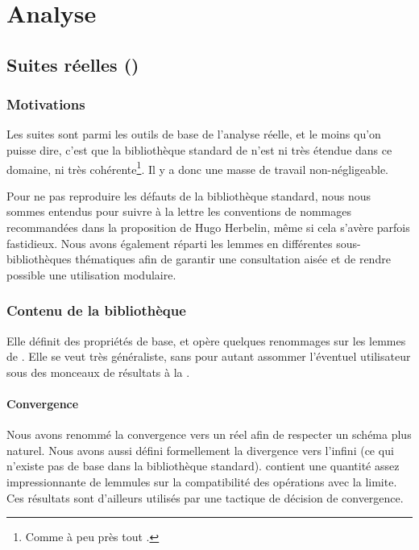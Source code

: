 \section{Analyse}

\subsection{Suites réelles ()}

\subsubsection{Motivations}

Les suites sont parmi les outils de base de l'analyse réelle, et le moins qu'on puisse dire, c'est que la bibliothèque standard de \Coq{} n'est ni très étendue dans ce domaine, ni très cohérente\footnote{Comme à peu près tout .}. Il y a donc une masse de travail non-négligeable.

Pour ne pas reproduire les défauts de la bibliothèque standard, nous nous sommes entendus pour suivre à la lettre les conventions de nommages recommandées dans la proposition de Hugo Herbelin\cite{naming_conventions}, même si cela s'avère parfois fastidieux. Nous avons également réparti les lemmes en différentes sous-bibliothèques thématiques afin de garantir une consultation aisée et de rendre possible une utilisation modulaire.

\subsubsection{Contenu de la bibliothèque}

Elle définit des propriétés de base, et opère quelques renommages sur les lemmes de . Elle se veut très généraliste, sans pour autant assommer l'éventuel utilisateur sous des monceaux de résultats à la .

\paragraph{Convergence} Nous avons renommé la convergence vers un réel afin de respecter un schéma plus naturel. Nous avons aussi défini formellement la divergence vers l'infini (ce qui n'existe pas de base dans la bibliothèque standard).  contient une quantité assez impressionnante de lemmules sur la compatibilité des opérations avec la limite. Ces résultats sont d'ailleurs utilisés par une tactique de décision de convergence.

